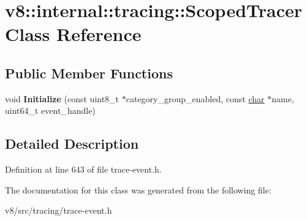 \hypertarget{classv8_1_1internal_1_1tracing_1_1ScopedTracer}{}\section{v8\+:\+:internal\+:\+:tracing\+:\+:Scoped\+Tracer Class Reference}
\label{classv8_1_1internal_1_1tracing_1_1ScopedTracer}
\subsection*{Public Member Functions}
\begin{DoxyCompactItemize}
\item 
\mbox{\label{classv8_1_1internal_1_1tracing_1_1ScopedTracer_a1fccb9a2117059aab777076c73b3c6cb}} 
void {\bfseries Initialize} (const uint8\+\_\+t $\ast$category\+\_\+group\+\_\+enabled, const \mbox{\hyperlink{classchar}{char}} $\ast$name, uint64\+\_\+t event\+\_\+handle)
\end{DoxyCompactItemize}


\subsection{Detailed Description}


Definition at line 643 of file trace-\/event.\+h.



The documentation for this class was generated from the following file\+:\begin{DoxyCompactItemize}
\item 
v8/src/tracing/trace-\/event.\+h\end{DoxyCompactItemize}
